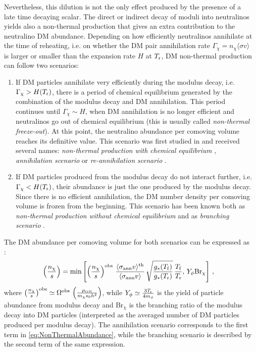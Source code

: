 \documentclass[11pt,a4paper]{article}
\newcommand{\be}{\begin{equation}}
\newcommand{\ee}{\end{equation}}
\begin{document}
Nevertheless, this dilution is not the only effect produced by the presence of a late time decaying scalar. The direct or indirect decay of moduli into neutralinos yields also a non-thermal production that gives an extra contribution to the neutralino DM abundance. Depending on how efficiently neutralinos annihilate at the time of reheating, i.e. on whether the DM pair annihilation rate $\Gamma_\chi = n_\chi \langle \sigma v \rangle$ is larger or smaller than the expansion rate $H$ at $T_{\rm r}$, DM non-thermal production can follow two scenarios:
\begin{enumerate}
\item If DM particles annihilate very efficiently during the modulus decay, i.e. $\Gamma_\chi > H(T_{\rm r})$, there is a period of chemical equilibrium generated by the combination of the modulus decay and DM annihilation. This period continues until $\Gamma_\chi \sim H$, when DM annihilation is no longer efficient and neutralinos go out of chemical equilibrium (this is usually called \textit{non-thermal freeze-out}). At this point, the neutralino abundance per comoving volume reaches its definitive value. This scenario was first studied in \cite{McDonald:1989jd,Moroi:1999zb,Giudice:2000ex} and received several names: \textit{non-thermal production with chemical equilibrium} \cite{Gelmini:2006pw}, \textit{annihilation scenario} \cite{Kane:2015jia} or \textit{re-annihilation scenario} \cite{Cheung:2010gj}.
 
\item If DM particles produced from the modulus decay do not interact further, i.e. $\Gamma_\chi < H(T_{\rm r})$, their abundance is just the one produced by the modulus decay. Since there is no efficient annihilation, the DM number density per comoving volume is frozen from the beginning. This scenario has been known both as \textit{non-thermal production without chemical equilibrium} \cite{Gelmini:2006pw} and as \textit{branching scenario} \cite{Kane:2015jia}.
\end{enumerate}

The DM abundance per comoving volume for both scenarios can be expressed as \cite{Moroi:1999zb}:
\be
\left(\frac{n_\chi}{s}\right) = \text{min} \left[\left(\frac{n_\chi}{s}\right)^{\rm obs} \, \frac{\langle \sigma_{\rm ann} v\rangle^{\rm th}}{\langle \sigma_{\rm ann} v\rangle} \, \sqrt{\frac{g_*(T_{\rm f})} {g_*(T_{\rm r})}} \, \frac{T_{\rm f}}{T_{\rm r}}, \, Y_\phi \text{Br}_{\chi}\right] \,,
\label{eq:NonThermalAbundance}
\ee
where $\left(\frac{n_\chi}{s}\right)^{\rm obs} \simeq \Omega^{\rm obs} \, \left(\frac{\rho_{\rm crit}}{m_\chi s_0 h^2}\right)$, while $Y_\phi \simeq \frac{3 T_{\rm r}}{4 m_\phi}$ is the yield of particle abundance from modulus decay and Br$_\chi$ is the branching ratio of the modulus decay into DM particles (interpreted as the averaged number of DM particles produced per modulus decay). The annihilation scenario corresponds to the first term in \eqref{eq:NonThermalAbundance}, while the branching scenario is described by the second term of the same expression.
\end{document}
